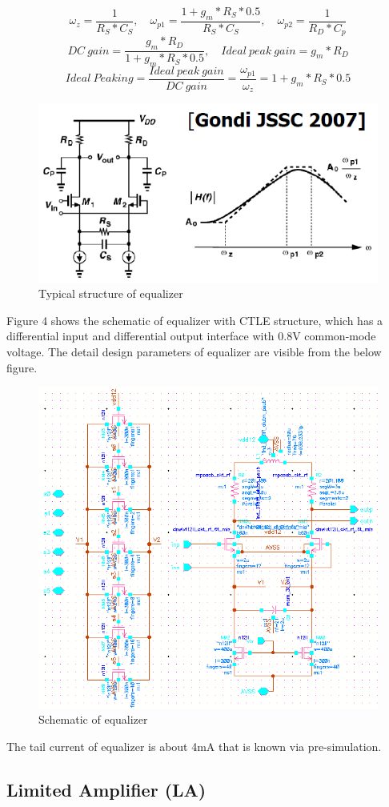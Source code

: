 \documentclass[11pt,a4paper]{article}
\begin{document}
\begin{spacing}{1.25}
$$\omega_z = \frac{1}{R_S * C_S},\quad \omega_{p1} = \frac{1 + g_m * R_S * 0.5}{R_S * C_S}, \quad \omega_{p2} = \frac{1}{R_D * C_p}$$
$$DC \ gain = \frac{g_m * R_D}{1 + g_m * R_S * 0.5}, \quad Ideal\ peak\ gain = g_m * R_D$$
$$Ideal \ Peaking = \frac{Ideal\ peak\ gain}{DC\ gain} = \frac{\omega_{p1}}{\omega_z} = 1 + g_m * R_S * 0.5$$
 
\begin{figure}[H]
    \centerline{\includegraphics[width=0.6\linewidth]{./Img/typical_equalizer.png}}
    \caption{Typical structure of equalizer}
\end{figure}
Figure 4 shows the schematic of equalizer with CTLE structure, which has a differential input and differential output interface with 0.8V common-mode voltage. The detail design parameters of equalizer are visible from the below figure. 
\begin{figure}[H]
    \centerline{\includegraphics[width=0.7\linewidth]{./Img/Schematic_Equalizer_Background.png}}
    \caption{Schematic of equalizer}
\end{figure}
The tail current of equalizer is about 4mA that is known via pre-simulation.

\subsection{Limited Amplifier (LA)}


\end{spacing}
\end{document}
